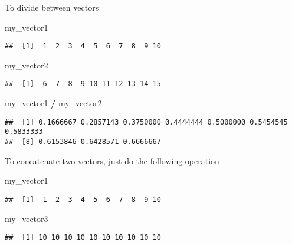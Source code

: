 \documentclass[
]{article}
\newenvironment{Shaded}{\begin{snugshade}}{\end{snugshade}}
\newcommand{\NormalTok}[1]{#1}
\newcommand{\SpecialCharTok}[1]{\textcolor[rgb]{0.81,0.36,0.00}{\textbf{#1}}}
\begin{document}
To divide between vectors

\begin{Shaded}
\begin{Highlighting}[]
\NormalTok{my\_vector1}
\end{Highlighting}
\end{Shaded}

\begin{verbatim}
##  [1]  1  2  3  4  5  6  7  8  9 10
\end{verbatim}

\begin{Shaded}
\begin{Highlighting}[]
\NormalTok{my\_vector2}
\end{Highlighting}
\end{Shaded}

\begin{verbatim}
##  [1]  6  7  8  9 10 11 12 13 14 15
\end{verbatim}

\begin{Shaded}
\begin{Highlighting}[]
\NormalTok{my\_vector1 }\SpecialCharTok{/}\NormalTok{ my\_vector2}
\end{Highlighting}
\end{Shaded}

\begin{verbatim}
##  [1] 0.1666667 0.2857143 0.3750000 0.4444444 0.5000000 0.5454545 0.5833333
##  [8] 0.6153846 0.6428571 0.6666667
\end{verbatim}

To concatenate two vectors, just do the following operation

\begin{Shaded}
\begin{Highlighting}[]
\NormalTok{my\_vector1}
\end{Highlighting}
\end{Shaded}

\begin{verbatim}
##  [1]  1  2  3  4  5  6  7  8  9 10
\end{verbatim}

\begin{Shaded}
\begin{Highlighting}[]
\NormalTok{my\_vector3}
\end{Highlighting}
\end{Shaded}

\begin{verbatim}
##  [1] 10 10 10 10 10 10 10 10 10 10
\end{verbatim}
\end{document}

